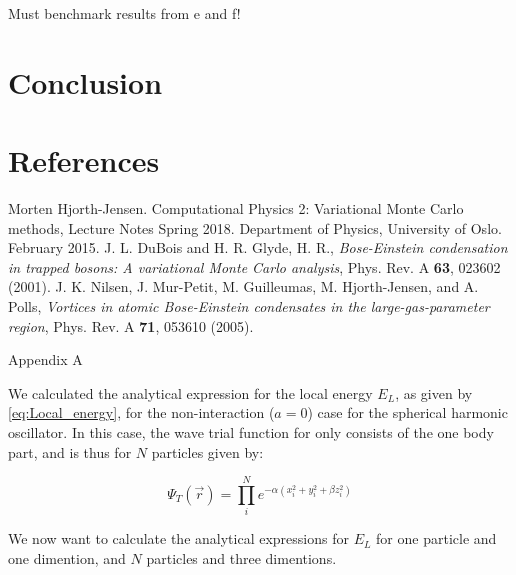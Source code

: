 \documentclass[norsk,a4paper,12pt]{article}
\begin{document}
Must benchmark results from e and f!


\section{Conclusion}

\newpage
\section{References}
\begingroup
\renewcommand{\section}[2]{}
\begin{thebibliography}{}
	Morten Hjorth-Jensen.
	Computational Physics 2: Variational Monte Carlo methods, Lecture Notes Spring 2018.
	Department of Physics, University of Oslo.
	February 2015.
	J. L. DuBois and H. R. Glyde, H. R., \emph{Bose-Einstein condensation in trapped bosons: A variational Monte Carlo analysis}, Phys. Rev. A \textbf{63}, 023602 (2001).
	J. K. Nilsen,  J. Mur-Petit, M. Guilleumas, M. Hjorth-Jensen, and A. Polls, \emph{Vortices in atomic Bose-Einstein condensates in the large-gas-parameter region}, Phys. Rev. A \textbf{71}, 053610 (2005).
\end{thebibliography}

\newpage

\section{Appendix}

\subsection{Appendix A}
\label{appendix_A}

We calculated the analytical expression for the local energy $E_L$, as given by \ref{eq:Local_energy}, for the non-interaction ($a=0$) case for the spherical harmonic oscillator. In this case, the wave trial function for only consists of the one body part, and is thus for $N$ particles given by:

\begin{equation}
	\label{eq:WF_nointeract}
	\Psi_T(\vec{r}) = \prod_i^N e^{-\alpha(x_i^2 + y_i^2 + \beta z_i^2)}
\end{equation}

We now want to calculate the analytical expressions for $E_L$ for one particle and one dimention, and $N$ particles and three dimentions.
\end{document}
